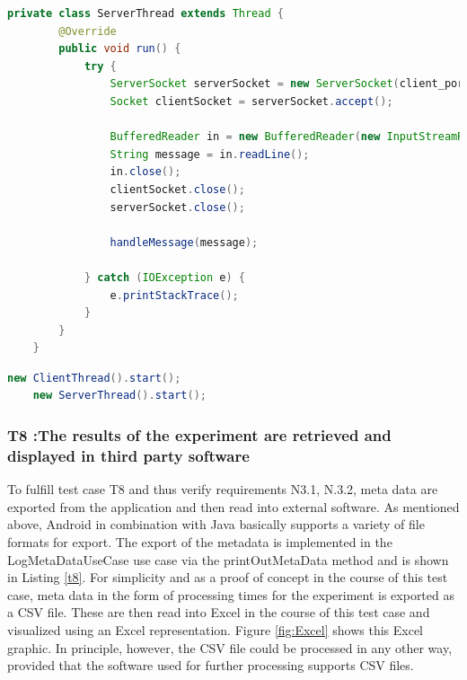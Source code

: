 \begin{lstlisting}[language=java,label=t7a,lineskip={0pt}, caption=Collect time needed to conduct experiment (b), basicstyle=\scriptsize, captionpos=b]
private class ServerThread extends Thread {
        @Override
        public void run() {
            try {
                ServerSocket serverSocket = new ServerSocket(client_port);
                Socket clientSocket = serverSocket.accept();

                BufferedReader in = new BufferedReader(new InputStreamReader(clientSocket.getInputStream()));
                String message = in.readLine();
                in.close();
                clientSocket.close();
                serverSocket.close();

                handleMessage(message);

            } catch (IOException e) {
                e.printStackTrace();
            }
        }
    }
\end{lstlisting}

\begin{lstlisting}[language=java,label=t7c,lineskip={0pt}, caption=Collect time needed to conduct experiment (b), basicstyle=\scriptsize, captionpos=b]
    new ClientThread().start();
    new ServerThread().start();
\end{lstlisting}

\newpage

\subsubsection*{T8 :The results of the experiment are retrieved and displayed in third party software}

To fulfill test case T8 and thus verify requirements N3.1, N.3.2, meta data are exported from the application and then read into external software. As mentioned above, Android in combination with Java basically supports a variety of file formats for export. The export of the metadata is implemented in the LogMetaDataUseCase use case via the printOutMetaData method and is shown in Listing \ref{t8}. For simplicity and as a proof of concept in the course of this test case, meta data in the form of processing times for the experiment is exported as a CSV file. These are then read into Excel in the course of this test case and visualized using an Excel representation. Figure \ref{fig:Excel} shows this Excel graphic. In principle, however, the CSV file could be processed in any other way, provided that the software used for further processing supports CSV files. 

